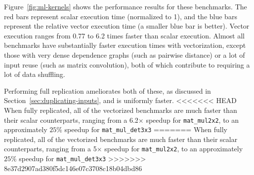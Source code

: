 Figure~\ref{fig:ml-kernels} shows the performance results for these benchmarks.
The red bars represent scalar execution time (normalized to 1), and the blue bars represent the relative vector execution time (a smaller blue bar is better).
Vector execution ranges from 0.77 to 6.2 times faster than scalar execution.
Almost all benchmarks have substantially faster execution times with vectorization, except those with very dense dependence graphs (such as pairwise distance) or a lot of input reuse (such as matrix convolution), both of which contribute to requiring a lot of data shuffling.


Performing full replication ameliorates both of these, as discussed in Section~\ref{sec:duplicating-inputs}, and is uniformly faster.
<<<<<<< HEAD
When fully replicated, all of the vectorized benchmarks are much faster than their scalar counterparts, ranging from a 6.2$\times$ speedup for \texttt{mat\_mul2x2}, to an approximately $25\%$ speedup for \texttt{mat\_mul\_det3x3}
=======
When fully replicated, all of the vectorized benchmarks are much faster than their scalar counterparts, ranging from a 5$\times$ speedup for \texttt{mat\-\_mul2x2}, to an approximately $25\%$ speedup for \texttt{mat\-\_mul\-\_det3x3}
>>>>>>> 8e37d2907ad380f5dc146e07c3708c18b04dbd86

